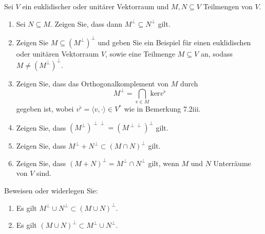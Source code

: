 \begin{Problem}
	Sei $V$ ein euklidischer oder unitärer Vektorraum und $M,N\subseteq V$ Teilmengen von $V$.
	\begin{enumerate}[label=(\alph*)]
	\item Sei $N\subseteq M$. Zeigen Sie, dass dann $M^{\perp}\subseteq N^{\perp}$ gilt.
	\item Zeigen Sie $M\subseteq \left( M^\perp \right)^\perp$ und geben Sie ein Beispiel f\"{u}r einen euklidischen oder unitären Vektorraum $V$, sowie eine Teilmenge $M\subseteq V$ an, sodass $M\neq (M^\perp)^\perp$.
	\item Zeigen Sie, dass das Orthogonalkomplement von $M$ durch
		\[
			M^\perp=\bigcap_{v\in M} \text{ker}v^\flat
		\]
		gegeben ist, wobei $v^\flat = \langle v,\cdot\rangle\in V^*$ wie in Bemerkung 7.2iii.
	\item Zeigen Sie, dass $(M^\perp)^{\perp\perp}=(M^{\perp\perp})^\perp$ gilt.
	\item Zeigen Sie, dass $M^\perp+N^\perp\subset (M\cap N)^\perp$ gilt.
	\item Zeigen Sie, dass $(M+N)^\perp=M^\perp\cap N^\perp$ gilt, wenn $M$ und $N$ Unterräume von $V$ sind.
	\end{enumerate}
	Beweisen oder widerlegen Sie:
	\begin{enumerate}[label=(\alph*),resume]
		\item Es gilt $M^\perp\cup N^\perp\subset (M\cup N)^\perp$.
		\item Es gilt $(M\cup N)^\perp\subset M^\perp \cup N^\perp$.
	\end{enumerate}
\end{Problem}
